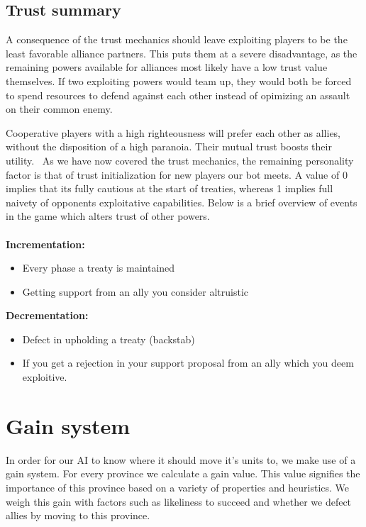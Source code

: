 \documentclass[a4paper]{article} %
\begin{document}
\subsection{Trust summary}

A consequence of the trust mechanics should leave exploiting players to be the least favorable alliance partners. This puts them at a severe disadvantage, as the remaining powers available for alliances most likely have a low trust value themselves. If two exploiting powers would team up, they would  both be forced to spend resources to defend against each other instead of opimizing an assault on their common enemy.

Cooperative players with a high righteousness will prefer each other as allies, without the disposition of a high paranoia. Their mutual trust boosts their utility.
\
As we have now covered the trust mechanics, the remaining personality factor is that of trust initialization for new players our bot meets. A value of 0 implies that its fully cautious at the start of treaties, whereas 1 implies full naivety of opponents exploitative capabilities. Below is a brief overview of events in the game which alters trust of other powers.\\
\
\\
\textbf{Incrementation:}
\begin{itemize}
\item {Every phase a treaty is maintained}
\item {Getting support from an ally you consider altruistic}
\end{itemize}
\textbf{Decrementation:}
\begin{itemize}
\item{Defect in upholding a treaty (backstab)}
\item{If you get a rejection in your support proposal from an ally which you deem exploitive.}
\end{itemize}
\section{Gain system}


In order for our AI to know where it should move it's units to, we make use of a gain system. For every province we calculate a gain value. This value signifies the importance of this province based on a variety of properties and heuristics. We weigh this gain with factors such as likeliness to succeed and whether we defect allies by moving to this province. 
\end{document}
